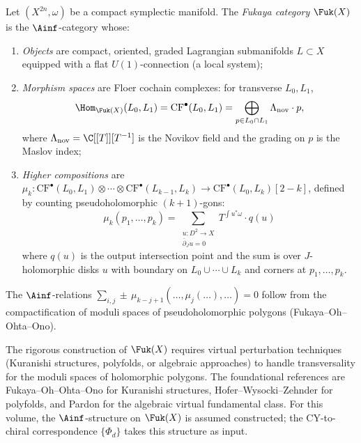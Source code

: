 \begin{definition}
\label{def:fukaya-category}
Let $(X^{2n}, \omega)$ be a compact symplectic manifold. The
\emph{Fukaya category} $\Fuk(X)$ is the $\Ainf$-category whose:
\begin{enumerate}[label=(\roman*)]
 \item \emph{Objects} are compact, oriented, graded Lagrangian
 submanifolds $L \subset X$ equipped with a flat $U(1)$-connection
 (a local system);
 \item \emph{Morphism spaces} are Floer cochain complexes:
 for transverse $L_0, L_1$,
 \[
 \Hom_{\Fuk(X)}(L_0, L_1) = \mathrm{CF}^\bullet(L_0, L_1)
 = \bigoplus_{p \in L_0 \cap L_1} \Lambda_{\mathrm{nov}} \cdot p,
 \]
 where $\Lambda_{\mathrm{nov}} = \C[[T]][T^{-1}]$ is the Novikov
 field and the grading on $p$ is the Maslov index;
 \item \emph{Higher compositions} are
 $\mu_k \colon \mathrm{CF}^\bullet(L_0, L_1) \otimes \cdots
 \otimes \mathrm{CF}^\bullet(L_{k-1}, L_k)
 \to \mathrm{CF}^\bullet(L_0, L_k)[2-k]$,
 defined by counting pseudoholomorphic $(k+1)$-gons:
 \[
 \mu_k(p_1, \ldots, p_k)
 = \sum_{\substack{u \colon D^2 \to X \\ \bar\partial_J u = 0}}
 T^{\int u^*\omega} \cdot q(u)
 \]
 where $q(u)$ is the output intersection point and the sum
 is over $J$-holomorphic disks $u$ with boundary on
 $L_0 \cup \cdots \cup L_k$ and corners at
 $p_1, \ldots, p_k$.
\end{enumerate}
The $\Ainf$-relations $\sum_{i,j} \pm\, \mu_{k-j+1}(\ldots,
\mu_j(\ldots), \ldots) = 0$ follow from the compactification of
moduli spaces of pseudoholomorphic polygons (Fukaya--Oh--Ohta--Ono).
\end{definition}

\begin{remark}
\label{rem:fukaya-analytic}
The rigorous construction of $\Fuk(X)$ requires virtual perturbation
techniques (Kuranishi structures, polyfolds, or algebraic approaches)
to handle transversality for the moduli spaces of holomorphic
polygons. The foundational references are Fukaya--Oh--Ohta--Ono for
Kuranishi structures, Hofer--Wysocki--Zehnder for polyfolds, and
Pardon for the algebraic virtual fundamental class. For this volume,
the $\Ainf$-structure on $\Fuk(X)$ is assumed constructed; the
CY-to-chiral correspondence $\{\Phi_d\}$ takes this structure as input.
\end{remark}

